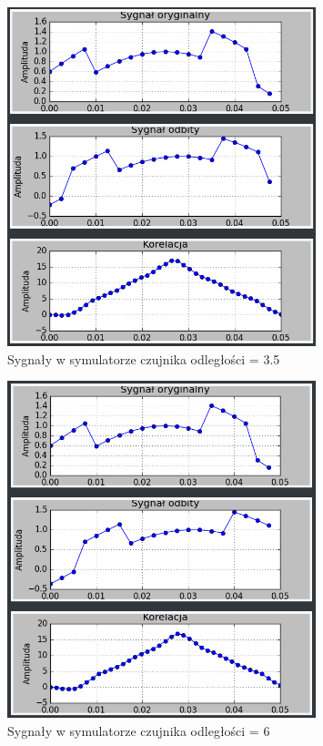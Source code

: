 \documentclass{article}
\begin{document}
{{\begin{figure}[h!]
                \includegraphics[width=0.8\textwidth]{img/sim14.png}
                \caption{Sygnały w symulatorze czujnika odległości = 3.5}
            \end{figure}
            \begin{figure}[h!]
                \centering
                \includegraphics[width=0.8\textwidth]{img/sim15.png}
                \caption{Sygnały w symulatorze czujnika odległości = 6}
            \end{figure}
}}
\end{document}
